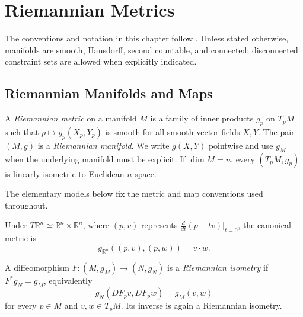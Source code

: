 \chapter{Riemannian Metrics}
\label{chap:pet-riemannian-metrics}

The conventions and notation in this chapter follow \cite{petersen2016}. Unless
stated otherwise, manifolds are smooth, Hausdorff, second countable, and
connected; disconnected constraint sets are allowed when explicitly indicated.

\section{Riemannian Manifolds and Maps}

\begin{definition}
  \label{def:pet-ch1-riemannian-manifold}

  A \emph{Riemannian metric} on a manifold $M$ is a family of inner products
  $g_p$ on $T_pM$ such that $p\mapsto g_p(X_p,Y_p)$ is smooth for all smooth
  vector fields $X,Y$. The pair $(M,g)$ is a \emph{Riemannian manifold}. We
  write $g(X,Y)$ pointwise and use $g_M$ when the underlying manifold must be
  explicit. If $\dim M=n$, every $(T_pM,g_p)$ is linearly isometric to
  Euclidean $n$-space.
\end{definition}

The elementary models below fix the metric and map conventions used throughout.

\begin{example}
  \label{ex:pet-ch1-euclidean-space}


  Under $T\mathbb{R}^n\simeq\mathbb{R}^n\times\mathbb{R}^n$, where
  $(p,v)$ represents $\frac{d}{dt}(p+tv)|_{t=0}$, the canonical metric is
  \[
    g_{\mathbb{R}^n}((p,v),(p,w))=v\cdot w.
  \]
\end{example}

\begin{definition}
  \label{def:pet-ch1-riemannian-isometry}


  A diffeomorphism $F:(M,g_M)\to(N,g_N)$ is a \emph{Riemannian isometry} if
  $F^*g_N=g_M$, equivalently
  \[
    g_N(DF_pv,DF_pw)=g_M(v,w)
  \]
  for every $p\in M$ and $v,w\in T_pM$. Its inverse is again a Riemannian
  isometry.
\end{definition}

